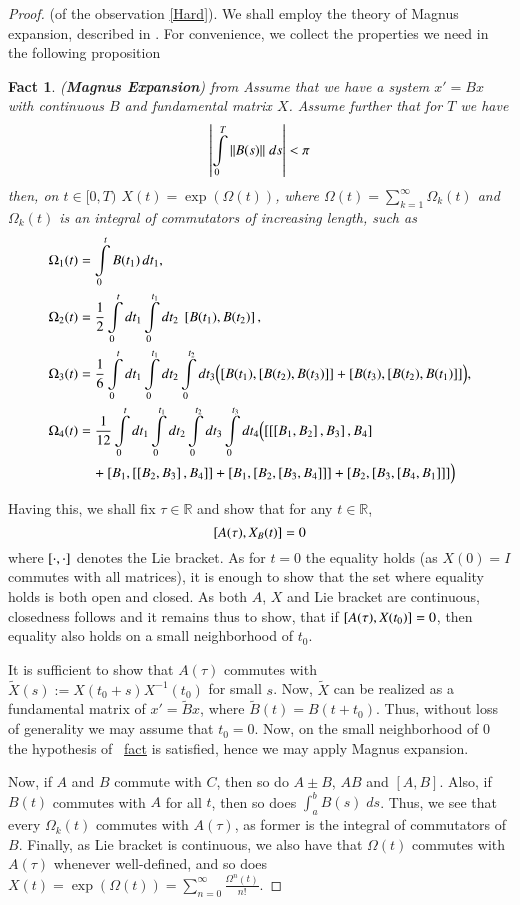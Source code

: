 \documentclass{elsarticle}
\newtheorem*{fact}{Fact}
\theoremstyle{remark}
\begin{document}
\begin{proof}{(of the observation \ref{Hard}).\;}
We shall employ the theory of Magnus expansion, described in \cite{Moan:2008:CMS:1391929.1391932}. For convenience, we collect
the properties we need in the following proposition
\begin{fact}{(\textbf{Magnus Expansion}) from \cite{Moan:2008:CMS:1391929.1391932}}
	Assume that we have a system $x'=Bx$ with continuous $B$ and fundamental matrix $X$. Assume
	further that for $T$ we have
	\[\myabs{\int_0^T\mynorm{B(s)}\;ds}<\pi\]
	then, on $t\in[0,T)$ $X(t)=\exp(\Omega(t))$, where $\Omega(t)=\sum\limits_{k=1}^\infty\Omega_k(t)$ and $\Omega_k(t)$ is an integral
	of commutators of increasing length, such as
	\begin{align*}
	\Omega_1(t) &= \int_0^t B(t_1)\,dt_1, \\
	\Omega_2(t) &= \frac{1}{2}\int_0^t dt_1 \int_0^{t_1} dt_2\ \left[  B(t_1),B(t_2)\right], \\
	\Omega_3(t) &= \frac{1}{6} \int_0^t dt_1 \int_0^{t_1}d t_2 \int_0^{t_2} dt_3
	\Bigl(\left[B(t_1),\left[B(t_2),B(t_3)\right]\right]+\left[B(t_3),\left[  B(t_2),B(t_{1})\right]\right]\Bigr), \\
	\Omega_4(t) &= \frac{1}{12} \int_0^t dt_1 \int_0^{t_1}d t_2 \int_0^{t_2} dt_3 \int_0^{t_3} dt_4
	\Bigl(\left[\left[\left[B_1,B_2\right],B_3\right],B_4\right] \\
	&\quad+\left[B_1,\left[\left[B_2,B_3\right],B_4\right]\right]
	+\left[B_1,\left[B_2,\left[B_3,B_4\right]\right]\right]
	+\left[B_2,\left[B_3,\left[B_4,B_1\right]\right]\right]\Bigr)
	\end{align*}
\end{fact}
Having this, we shall fix $\tau\in\mathbb{R}$ and show that for any $t\in\mathbb{R}$,
\[\left[A(\tau),X_B(t)\right]=0\]
where $\left[\cdot,\cdot\right]$ denotes the Lie bracket. As for $t=0$ the equality holds (as $X(0)=I$ commutes with all matrices), it is enough
to show that the set where equality holds is both open and closed. As both $A$, $X$ and Lie bracket are continuous, closedness follows and it
remains thus to show, that if $\left[A(\tau),X(t_0)\right]=0$, then equality also holds on a small neighborhood of $t_0$.

It is sufficient to show that $A(\tau)$ commutes with $\tilde{X}(s):=X(t_0+s)X^{-1}(t_0)$ for small $s$. Now, $\tilde{X}$ can be realized
as a fundamental matrix of $x'=\tilde{B}x$, where $\tilde{B}(t)=B(t+t_0)$. Thus, without loss of generality we may assume that
$t_0=0$. Now, on the small
neighborhood of $0$ the hypothesis of ~\hyperref[MagnusConvergenceFact]{fact} is satisfied, hence we may apply Magnus expansion.

Now, if $A$ and $B$ commute with $C$, then so do $A\pm B$, $AB$ and $[A,B]$. Also, if $B(t)$ commutes with $A$ for all $t$, then so does
$\int_a^bB(s)\;ds$. Thus, we see that every $\Omega_k(t)$ commutes with $A(\tau)$, as former is the integral of commutators of $B$. Finally,
as Lie bracket is continuous, we also have that $\Omega(t)$ commutes with $A(\tau)$ whenever well-defined, and so does $X(t)=\exp(\Omega(t))=
\sum_{n=0}^\infty\frac{\Omega^n(t)}{n!}$.
\end{proof}
\end{document}
